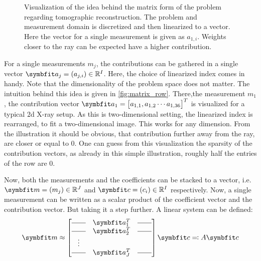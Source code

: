 \begin{figure}
	\centering
	\resizebox{0.7\textwidth}{!}{%
		
	}%
	\caption{Visualization of the idea behind the matrix form of the problem regarding
		tomographic reconstruction. The problem and measurement domain is discretized and
		then linearized to a vector. Here the vector for a single measurement is given as
		\(a_{1,i}\). Weights closer to the ray can be expected have a higher
		contribution.}\label{fig:matrix_row}
\end{figure}

For a single measurements \(m_j\), the contributions can be gathered in a single vector \(\mvec{a}_j
= (a_{j,i}) \in \mathbb{R}^I\). Here, the choice of linearized index comes in handy. Note that the
dimensionality of the problem space does not matter. The intuition behind this idea is given in
\autoref{fig:matrix_row}. There,the measurement \(m_1\), the contribution vector \(\mvec{a}_{1} =
\begin{bmatrix}a_{1, 1}, a_{1, 2} \cdots a_{1,36}\end{bmatrix}^T\) is visualized for a typical
\(2\)d X-ray setup. As this is two-dimensional setting, the linearized index is rearranged, to fit a
two-dimensional image. This works for any dimension. From the illustration it should be obvious,
that contribution further away from the ray, are closer or equal to \(0\). One can guess from this
visualization the sparsity of the contribution vectors, as already in this simple illustration,
roughly half the entries of the row are \(0\).

Now, both the measurements and the coefficients can be stacked to a vector, i.e. \(\mvec{m} = (m_j)
\in \mathbb{R}^J\) and \(\mvec{c} = (c_i) \in \mathbb{R}^I\) respectively. Now, a single measurement
can be written as a scalar product of the coefficient vector and the contribution vector. But taking
it a step further. A linear system can be defined:
\begin{equation}\label{eq:system_lin_equation}
	\mvec{m} \approx
	\begin{bmatrix}
		\rule[.5ex]{2em}{0.4pt} & \mvec{a}_1^T & \rule[.5ex]{2em}{0.4pt} \\
		\rule[.5ex]{2em}{0.4pt} & \mvec{a}_2^T & \rule[.5ex]{2em}{0.4pt} \\
		\vdots                                                           \\
		\rule[.5ex]{2em}{0.4pt} & \mvec{a}_J^T & \rule[.5ex]{2em}{0.4pt}
	\end{bmatrix} \mvec{c} \eqcolon A \mvec{c}
\end{equation}

